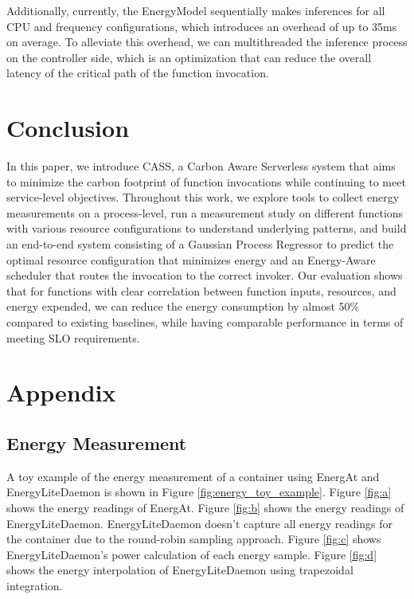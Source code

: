 \documentclass[times, 10pt,twocolumn]{article}
\begin{document}
Additionally, currently, the EnergyModel sequentially makes inferences for all CPU and frequency configurations, which introduces an overhead of up to 35ms on average. To alleviate this overhead, we can multithreaded the inference process on the controller side, which is an optimization that can reduce the overall latency of the critical path of the function invocation. 

\section{Conclusion}

In this paper, we introduce CASS, a Carbon Aware Serverless system that aims to minimize the carbon footprint of function invocations while continuing to meet service-level objectives. Throughout this work, we explore tools to collect energy measurements on a process-level, run a measurement study on different functions with various resource configurations to understand underlying patterns, and build an end-to-end system consisting of a Gaussian Process Regressor to predict the optimal resource configuration that minimizes energy and an Energy-Aware scheduler that routes the invocation to the correct invoker. Our evaluation shows that for functions with clear correlation between function inputs, resources, and energy expended, we can reduce the energy consumption by almost 50\% compared to existing baselines, while having comparable performance in terms of meeting SLO requirements. 






\appendix
\section{Appendix}
\subsection{Energy Measurement}
\label{appendix:energy_measurement}
A toy example of the energy measurement of a container using EnergAt and EnergyLiteDaemon is shown in Figure \ref{fig:energy_toy_example}. Figure \ref{fig:a} shows the energy readings of EnergAt. Figure \ref{fig:b} shows the energy readings of EnergyLiteDaemon. EnergyLiteDaemon doesn't capture all energy readings for the container due to the round-robin sampling approach. Figure \ref{fig:c} shows EnergyLiteDaemon's power calculation of each energy sample. Figure \ref{fig:d} shows the energy interpolation of EnergyLiteDaemon using trapezoidal integration.
\end{document}
